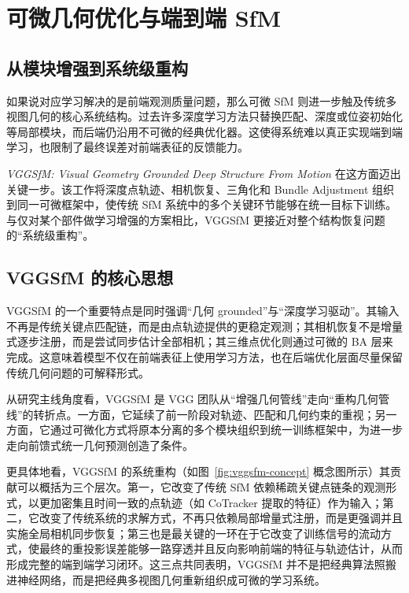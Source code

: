 \section{可微几何优化与端到端 SfM}

\subsection{从模块增强到系统级重构}

如果说对应学习解决的是前端观测质量问题，那么可微 SfM 则进一步触及传统多视图几何的核心系统结构。过去许多深度学习方法只替换匹配、深度或位姿初始化等局部模块，而后端仍沿用不可微的经典优化器。这使得系统难以真正实现端到端学习，也限制了最终误差对前端表征的反馈能力\cite{wang2021deep2view}。

\textit{VGGSfM: Visual Geometry Grounded Deep Structure From Motion} 在这方面迈出关键一步\cite{wang2024vggsfm}。该工作将深度点轨迹、相机恢复、三角化和 Bundle Adjustment 组织到同一可微框架中，使传统 SfM 系统中的多个关键环节能够在统一目标下训练。与仅对某个部件做学习增强的方案相比，VGGSfM 更接近对整个结构恢复问题的“系统级重构”。

\subsection{VGGSfM 的核心思想}

VGGSfM 的一个重要特点是同时强调“几何 grounded”与“深度学习驱动”。其输入不再是传统关键点匹配链，而是由点轨迹提供的更稳定观测；其相机恢复不是增量式逐步注册，而是尝试同步估计全部相机；其三维点优化则通过可微的 BA 层来完成\cite{wang2024vggsfm}。这意味着模型不仅在前端表征上使用学习方法，也在后端优化层面尽量保留传统几何问题的可解释形式。

从研究主线角度看，VGGSfM 是 VGG 团队从“增强几何管线”走向“重构几何管线”的转折点。一方面，它延续了前一阶段对轨迹、匹配和几何约束的重视；另一方面，它通过可微化方式将原本分离的多个模块组织到统一训练框架中，为进一步走向前馈式统一几何预测创造了条件。

更具体地看，VGGSfM 的系统重构（如图~\ref{fig:vggsfm-concept} 概念图所示）其贡献可以概括为三个层次。第一，它改变了传统 SfM 依赖稀疏关键点链条的观测形式，以更加密集且时间一致的点轨迹（如 CoTracker 提取的特征）作为输入；第二，它改变了传统系统的求解方式，不再只依赖局部增量式注册，而是更强调并且实施全局相机同步恢复；第三也是最关键的一环在于它改变了训练信号的流动方式，使最终的重投影误差能够一路穿透并且反向影响前端的特征与轨迹估计，从而形成完整的端到端学习闭环\cite{wang2024vggsfm,karaev2024cotracker}。这三点共同表明，VGGSfM 并不是把经典算法照搬进神经网络，而是把经典多视图几何重新组织成可微的学习系统。

